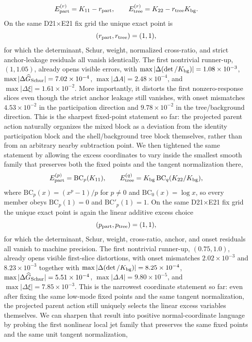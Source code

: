 \documentclass[aps,prd,onecolumn,notitlepage,nofootinbib,superscriptaddress,11pt,floatfix]{revtex4-2}
\begin{document}
\[
E_{\rm part}^{(r)}=K_{11}-r_{\rm part},
\qquad
E_{\rm tree}^{(r)}=K_{22}-r_{\rm tree}K_{\rm bg}.
\]
On the same D21$\times$E21 fix grid the unique exact point is
\[
(r_{\rm part},r_{\rm tree})=(1,1),
\]
for which the determinant, Schur, weight, normalized cross-ratio, and strict anchor-leakage residuals all vanish identically. The first nontrivial runner-up, $(1,1.05)$, already opens visible errors, with $\max|\Delta(\det/K_{\rm bg})|=1.08\times10^{-3}$, $\max|\Delta \widehat G_{\rm Schur}|=7.02\times10^{-4}$, $\max|\Delta A|=2.48\times10^{-4}$, and $\max|\Delta \xi|=1.61\times10^{-2}$. More importantly, it distorts the first nonzero-response slices even though the strict anchor leakage still vanishes, with onset mismatches $4.53\times10^{-2}$ in the participation direction and $9.78\times10^{-2}$ in the tree/background direction. This is the sharpest fixed-point statement so far: the projected parent action naturally organizes the mixed block as a deviation from the identity participation block and the shell/background tree block themselves, rather than from an arbitrary nearby subtraction point.
We then tightened the same statement by allowing the excess coordinates to vary inside the smallest smooth family that preserves both the fixed points and the tangent normalization there,
\[
E_{\rm part}^{(p)}=\mathrm{BC}_p(K_{11}),
\qquad
E_{\rm tree}^{(q)}=K_{\rm bg}\,\mathrm{BC}_q(K_{22}/K_{\rm bg}),
\]
where $\mathrm{BC}_p(x)=(x^p-1)/p$ for $p\neq 0$ and $\mathrm{BC}_0(x)=\log x$, so every member obeys $\mathrm{BC}_p(1)=0$ and $\mathrm{BC}'_p(1)=1$. On the same D21$\times$E21 fix grid the unique exact point is again the linear additive excess choice
\[
(p_{\rm part},p_{\rm tree})=(1,1),
\]
for which the determinant, Schur, weight, cross-ratio, anchor, and onset residuals all vanish to machine precision. The first nontrivial runner-up, $(0.75,1.0)$, already opens visible first-slice distortions, with onset mismatches $2.02\times10^{-3}$ and $8.23\times10^{-3}$ together with $\max|\Delta(\det/K_{\rm bg})|=8.25\times10^{-4}$, $\max|\Delta \widehat G_{\rm Schur}|=5.51\times10^{-4}$, $\max|\Delta A|=9.80\times10^{-5}$, and $\max|\Delta \xi|=7.85\times10^{-3}$. This is the narrowest coordinate statement so far: even after fixing the same low-mode fixed points and the same tangent normalization, the projected parent action still uniquely selects the linear excess variables themselves.
We can sharpen that result into positive normal-coordinate language by probing the first nonlinear local jet family that preserves the same fixed points and the same unit tangent normalization,
\end{document}
